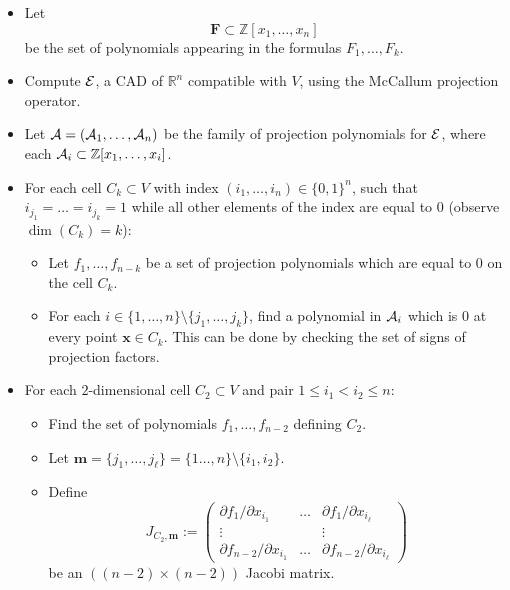 \documentclass[
]{book}
\theoremstyle{definition}
\theoremstyle{definition}
\theoremstyle{definition}
\theoremstyle{definition}
\theoremstyle{remark}
\begin{document}
\begin{itemize}
\item
  Let \[
  \mathbf{F} \subset \mathbb{Z}[x_1,\ldots,x_n]
  \]
  be the set of polynomials appearing in the formulas \(F_1,\ldots,F_k\).
\item
  Compute \(\cal E\), a CAD of \(\mathbb{R}^n\) compatible with \(V\), using the McCallum projection operator.
\item
  Let \({\cal A} = ({\cal A}_1,\ldots,{\cal A}_{n})\) be the family of projection polynomials for \(\cal E\), where each \({\cal A}_i \subset \mathbb{Z}[x_1,\ldots,x_i]\).
\item
  For each cell \(C_k \subset V\) with index \((i_1,\ldots,i_n) \in \{0,1\}^n\), such that \(i_{j_1} = \ldots = i_{j_k} = 1\) while all other elements of the index are equal to \(0\) (observe \(\dim(C_k) = k\)):

  \begin{itemize}
  \item
    Let \(f_1,\ldots,f_{n-k}\) be a set of projection polynomials which are equal to \(0\) on the cell \(C_k\).
  \item
    For each \(i \in \{1,\ldots,n\} \setminus \{j_1,\ldots,j_k\}\), find a polynomial in \({\cal A}_i\) which is \(0\) at every point \(\mathbf{x} \in C_k\). This can be done by checking the set of signs of projection factors.
  \end{itemize}
\item
  For each \(2\)-dimensional cell \(C_2 \subset V\) and pair \(1 \le i_1 < i_2 \le n\):

  \begin{itemize}
  \item
    Find the set of polynomials \(f_1,\ldots,f_{n-2}\) defining \(C_2\).
  \item
    Let \(\mathbf{m} = \{j_1,\ldots,j_\ell\} = \{1\ldots,n\} \setminus \{i_1,i_2\}\).
  \item
    Define
    \begin{equation}
    J_{C_2,\mathbf{m}} :=
    \begin{pmatrix}\partial f_{1}/\partial x_{i_{1}} & \ldots & \partial f_{1}/\partial x_{i_{\ell}}\\
    \vdots &  & \vdots\\
    \partial f_{n-2}/\partial x_{i_{1}} & \ldots & \partial f_{n-2}/\partial x_{i_{\ell}}
    \end{pmatrix}
    \label{eq:jacobi-two}
    \end{equation}
    be an \(((n-2)\times (n-2))\) Jacobi matrix.


\end{itemize}
\end{itemize}
\end{document}
